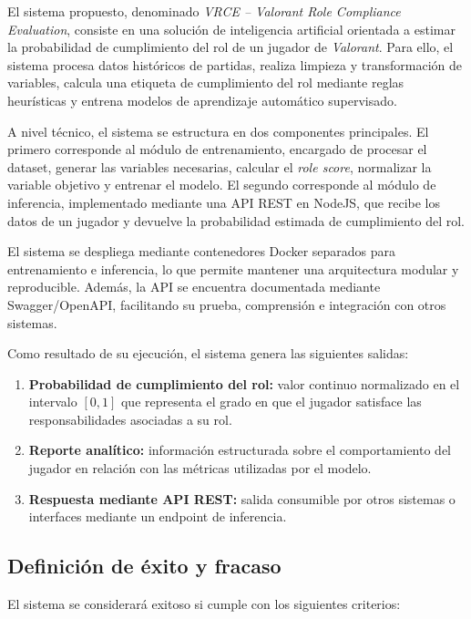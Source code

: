 \documentclass{ULBreport} %
\begin{document}
El sistema propuesto, denominado \textit{VRCE -- Valorant Role Compliance Evaluation}, consiste en una solución de inteligencia artificial orientada a estimar la probabilidad de cumplimiento del rol de un jugador de \textit{Valorant}. Para ello, el sistema procesa datos históricos de partidas, realiza limpieza y transformación de variables, calcula una etiqueta de cumplimiento del rol mediante reglas heurísticas y entrena modelos de aprendizaje automático supervisado.

A nivel técnico, el sistema se estructura en dos componentes principales. El primero corresponde al módulo de entrenamiento, encargado de procesar el dataset, generar las variables necesarias, calcular el \textit{role score}, normalizar la variable objetivo y entrenar el modelo. El segundo corresponde al módulo de inferencia, implementado mediante una API REST en NodeJS, que recibe los datos de un jugador y devuelve la probabilidad estimada de cumplimiento del rol.

El sistema se despliega mediante contenedores Docker separados para entrenamiento e inferencia, lo que permite mantener una arquitectura modular y reproducible. Además, la API se encuentra documentada mediante Swagger/OpenAPI, facilitando su prueba, comprensión e integración con otros sistemas.

Como resultado de su ejecución, el sistema genera las siguientes salidas:

\begin{enumerate}
    \item \textbf{Probabilidad de cumplimiento del rol:} valor continuo normalizado en el intervalo $[0,1]$ que representa el grado en que el jugador satisface las responsabilidades asociadas a su rol.
    \item \textbf{Reporte analítico:} información estructurada sobre el comportamiento del jugador en relación con las métricas utilizadas por el modelo.
    \item \textbf{Respuesta mediante API REST:} salida consumible por otros sistemas o interfaces mediante un endpoint de inferencia.
\end{enumerate}

\subsection{Definición de éxito y fracaso}

El sistema se considerará exitoso si cumple con los siguientes criterios:
\end{document}
